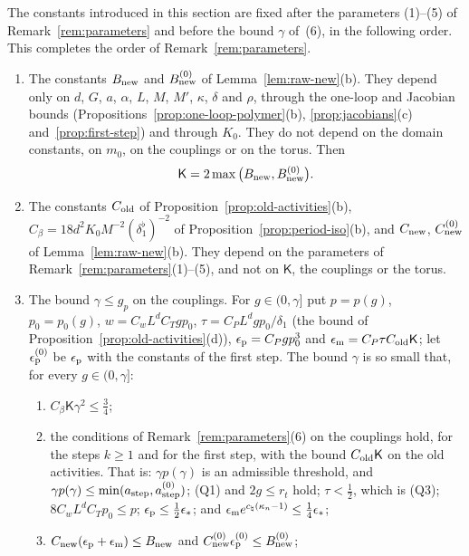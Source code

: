 \begin{remark}\label{rem:flow-constants}
The constants introduced in this section are fixed after the parameters (1)--(5) of Remark~\ref{rem:parameters} and before the bound $\gamma$ of~(6), in the following order. This completes the order of Remark~\ref{rem:parameters}.
\begin{enumerate}[label=(\roman*)]
\item The constants $B_{\rm new}$ and $B^{(0)}_{\rm new}$ of Lemma~\ref{lem:raw-new}(b). They depend only on $d$, $G$, $a$, $\alpha$, $L$, $M$, $M'$, $\kappa$, $\delta$ and $\rho$, through the one-loop and Jacobian bounds (Propositions~\ref{prop:one-loop-polymer}(b), \ref{prop:jacobians}(c) and~\ref{prop:first-step}) and through $K_0$. They do not depend on the domain constants, on $m_0$, on the couplings or on the torus. Then
\[
\mathsf K=2\max\big(B_{\rm new},B^{(0)}_{\rm new}\big).
\]
\item The constants $C_{\rm old}$ of Proposition~\ref{prop:old-activities}(b), $C_\beta=18d^2K_0M^{-2}(\delta_1^\flat)^{-2}$ of Proposition~\ref{prop:period-iso}(b), and $C_{\rm new}$, $C^{(0)}_{\rm new}$ of Lemma~\ref{lem:raw-new}(b). They depend on the parameters of Remark~\ref{rem:parameters}(1)--(5), and not on $\mathsf K$, the couplings or the torus.
\item The bound $\gamma\le g_p$ on the couplings. For $g\in(0,\gamma]$ put $p=p(g)$, $p_0=p_0(g)$, $w=C_wL^dC_Tgp_0$, $\tau=C_PL^dgp_0/\delta_1$ (the bound of Proposition~\ref{prop:old-activities}(d)), $\epsilon_{\rm p}=C_Pgp_0^3$ and $\epsilon_{\rm m}=C_P\tau C_{\rm old}\mathsf K$; let $\epsilon^{(0)}_{\rm p}$ be $\epsilon_{\rm p}$ with the constants of the first step. The bound $\gamma$ is so small that, for every $g\in(0,\gamma]$:
\begin{enumerate}[label=($\Gamma$\arabic*)]
\item $C_\beta\mathsf K\gamma^2\le\frac34$;
\item the conditions of Remark~\ref{rem:parameters}(6) on the couplings hold, for the steps $k\ge1$ and for the first step, with the bound $C_{\rm old}\mathsf K$ on the old activities. That is: $\gamma p(\gamma)$ is an admissible threshold, and $\gamma p(\gamma)\le\min(a_{\rm step},a^{(0)}_{\rm step})$; (Q1) and $2g\le r_t$ hold; $\tau<\frac12$, which is (Q3); $8C_wL^dC_Tp_0\le p$; $\epsilon_{\rm p}\le\frac12\epsilon_*$; and $\epsilon_{\rm m}e^{c_\natural(\kappa_n-1)}\le\frac14\epsilon_*$;
\item $C_{\rm new}(\epsilon_{\rm p}+\epsilon_{\rm m})\le B_{\rm new}$ and $C^{(0)}_{\rm new}\epsilon^{(0)}_{\rm p}\le B^{(0)}_{\rm new}$;

\end{enumerate}
\end{enumerate}
\end{remark}
